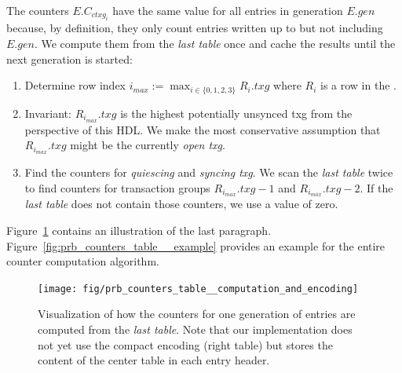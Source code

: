 \documentclass[12pt,a4paper,twoside]{book}
\begin{document}
{The counters $E.C_{ctxg_i}$ have the same value for all entries in generation $E.gen$  because, by definition, they only count entries written up to but not including $E.gen$.
We compute them from the \textit{last table} once and cache the results until the next generation is started:
\begin{enumerate}[noitemsep]
    \item Determine row index $i_{max} := \max_{i \in \{0,1,2,3\}} R_i.txg$ where $R_i$ is a row in the .
    \item Invariant: $R_{i_{max}}.txg$ is the highest potentially unsynced txg from the perspective of this HDL.
        We make the most conservative assumption that $R_{i_{max}}.txg$ might be the currently \textit{open txg}.
    \item Find the counters for \textit{quiescing} and \textit{syncing txg}.
        We scan the \textit{last table} twice to find counters for transaction groups $R_{i_{max}}.txg - 1$ and $R_{i_{max}}.txg - 2$.
        If the \textit{last table} does not contain those counters, we use a value of zero.
\end{enumerate}
Figure~\ref{fig:prb_counters_table__computation_and_encoding} contains an illustration of the last paragraph.
Figure~\ref{fig:prb_counters_table__example} provides an example for the entire counter computation algorithm.

\begin{figure}[H]
    \centering
    \texttt{[image: fig/prb\_counters\_table\_\_computation\_and\_encoding]}
    \caption{
        Visualization of how the counters for one generation of entries are computed from the \textit{last table}.
        Note that our implementation does not yet use the compact encoding (right table) but stores the content of the center table in each entry header.
    }
    \label{fig:prb_counters_table__computation_and_encoding}
\end{figure}

}
\end{document}
